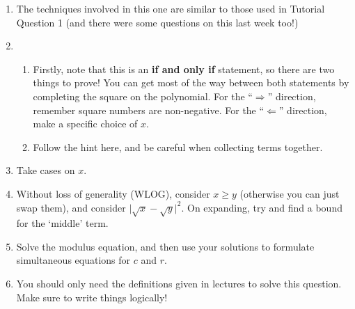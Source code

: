 \documentclass[
  10pt,
  a4paper]{article}
\providecommand{\tightlist}{%
  \setlength{\itemsep}{0pt}\setlength{\parskip}{0pt}}
\theoremstyle{plain}
\theoremstyle{definition}
\theoremstyle{plain}
\theoremstyle{plain}
\theoremstyle{plain}
\theoremstyle{plain}
\theoremstyle{definition}
\theoremstyle{definition}
\newtheorem*{Completeness Axiom*}{Completeness Axiom}\newtheorem{Completeness Axiom}{Completeness Axiom}[section]
\theoremstyle{remark}
\theoremstyle{remark}
\begin{document}
\begin{enumerate}
\def\labelenumi{\arabic{enumi}.}
\item
  The techniques involved in this one are similar to those used in Tutorial Question 1 (and there were some questions on this last week too!)
\item
  \begin{enumerate}
  \def\labelenumii{\roman{enumii})}
  \tightlist
  \item
    Firstly, note that this is an \textbf{if and only if} statement, so there are two things to prove! You can get most of the way between both statements by completing the square on the polynomial. For the ``\(\Rightarrow\)'' direction, remember square numbers are non-negative. For the ``\(\Leftarrow\)'' direction, make a specific choice of \(x\).
  \item
    Follow the hint here, and be careful when collecting terms together.
  \end{enumerate}
\item
  Take cases on \(x\).
\item
  Without loss of generality (WLOG), consider \(x \geq y\) (otherwise you can just swap them), and consider \(\lvert \sqrt{x} - \sqrt{y} \rvert^2\). On expanding, try and find a bound for the `middle' term.
\item
  Solve the modulus equation, and then use your solutions to formulate simultaneous equations for \(c\) and \(r\).
\item
  You should only need the definitions given in lectures to solve this question. Make sure to write things logically!
\end{enumerate}
\end{document}
